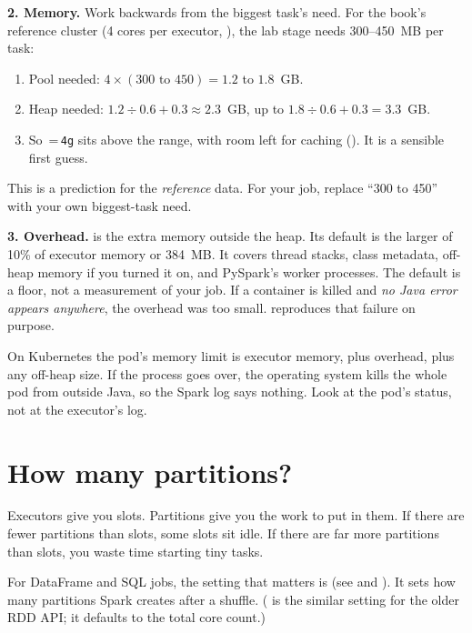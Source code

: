 \textbf{2. Memory.} Work backwards from the biggest task's need. For the book's
reference cluster (4 cores per executor, ), the lab stage needs
300--450~MB per task:
\begin{enumerate}[nosep]
\item Pool needed: $4 \times (300 \text{ to } 450) = 1.2$ to $1.8$~GB.
\item Heap needed: $1.2 \div 0.6 + 0.3 \approx 2.3$~GB, up to $1.8 \div 0.6 + 0.3 = 3.3$~GB.
\item So \,=\,\texttt{4g} sits above the range, with
      room left for caching (). It is a sensible first guess.
\end{enumerate}
This is a prediction for the \emph{reference} data. For your job, replace
``300 to 450'' with your own biggest-task need.

\textbf{3. Overhead.}  is the extra memory
outside the heap. Its default is the larger of 10\% of executor memory or 384~MB. It
covers thread stacks, class metadata, off-heap memory if you turned it on, and
PySpark's worker processes. The default is a floor, not a measurement of your job.
If a container is killed and \emph{no Java error appears anywhere}, the overhead was
too small.  reproduces that failure on purpose.

\begin{tip}
On Kubernetes the pod's memory limit is executor memory, plus overhead, plus any
off-heap size. If the process goes over, the operating system kills the whole pod
from outside Java, so the Spark log says nothing. Look at the pod's status, not at
the executor's log.
\end{tip}

\section{How many partitions?}
\label{sec:tuning-parallelism}

Executors give you slots. Partitions give you the work to put in them. If there are
fewer partitions than slots, some slots sit idle. If there are far more partitions
than slots, you waste time starting tiny tasks.

For DataFrame and SQL jobs, the setting that matters is
 (see  and
). It sets how many partitions Spark creates after a shuffle.
( is the similar setting for the older RDD API; it
defaults to the total core count.)

